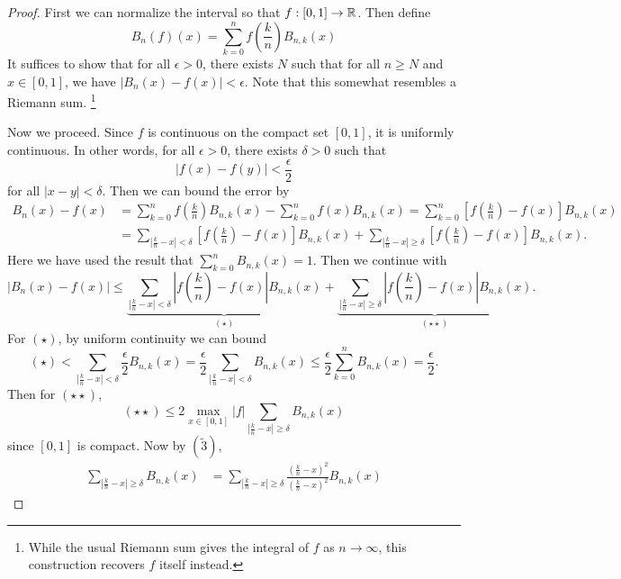 \begin{proof}
  First we can normalize the interval so that
  $f : [0, 1] \to \mathbb{R}$. Then define
  \[
    B_n(f)(x) = \sum_{k = 0}^n f\left(\frac{k}{n}\right) B_{n, k}(x)
  \]
  It suffices to show that for all $\epsilon > 0$,
  there exists $N$ such that for all $n \ge N$ and
  $x \in [0, 1]$, we have $|B_n(x) - f(x)| < \epsilon$.
  Note that this somewhat resembles a Riemann sum.
  \footnote{While the usual Riemann sum gives the integral of $f$ as $n \to \infty$, this construction recovers $f$ itself instead.}

  Now we proceed. Since $f$ is continuous on the compact
  set $[0, 1]$, it is uniformly continuous. In other
  words, for all $\epsilon > 0$, there exists $\delta > 0$
  such that
  \[
  |f(x) - f(y)| < \frac{\epsilon}{2}
  \]
  for all $|x - y| < \delta$. Then we can bound the
  error by
  \begin{align*}
    B_n(x) - f(x)
    &= \sum_{k = 0}^n f\left(\frac{k}{n}\right) B_{n, k}(x) - \sum_{k = 0}^n f(x) B_{n, k}(x)
    = \sum_{k = 0}^n \left[f\left(\frac{k}{n}\right) - f(x)\right] B_{n, k}(x) \\
    &= \sum_{\left|\frac{k}{n} - x\right| < \delta}
    \left[f\left(\frac{k}{n}\right) - f(x)\right] B_{n, k}(x)
    + \sum_{\left|\frac{k}{n} - x\right| \ge \delta}
    \left[f\left(\frac{k}{n}\right) - f(x)\right] B_{n, k}(x).
  \end{align*}
  Here we have used the result that
  $\sum_{k = 0}^n B_{n, k}(x) = 1$. Then we continue with
  \[
    |B_n(x) - f(x)| \le
    \underbrace{\sum_{\left|\frac{k}{n} - x\right| < \delta}
    \left|f\left(\frac{k}{n}\right) - f(x)\right| B_{n, k}(x)}_{(\star)}
    + \underbrace{\sum_{\left|\frac{k}{n} - x\right| \ge \delta}
    \left|f\left(\frac{k}{n}\right) - f(x)\right| B_{n, k}(x)}_{(\star \star)}
  .\]
  For $(\star)$, by uniform continuity we can bound
  \[
    (\star) < \sum_{\left|\frac{k}{n} - x\right| < \delta}
    \frac{\epsilon}{2} B_{n, k}(x)
    = \frac{\epsilon}{2} \sum_{\left|\frac{k}{n} - x\right| < \delta} B_{n, k}(x)
    \le \frac{\epsilon}{2} \sum_{k = 0}^n B_{n, k}(x)
    = \frac{\epsilon}{2}
  .\]
  Then for $(\star \star)$,
  \[
    (\star \star) \le 2 \max_{x \in [0, 1]} |f|
    \sum_{\left|\frac{k}{n} - x\right| \ge \delta} B_{n, k}(x)
  \]
  since $[0, 1]$ is compact. Now by $(\widetilde{3})$,
  \begin{align*}
    \sum_{\left|\frac{k}{n} - x\right| \ge \delta} B_{n, k}(x) &= \sum_{\left|\frac{k}{n} - x\right| \ge \delta}
    \frac{\left(\frac{k}{n} - x\right)^2}{\left(\frac{k}{n} - x\right)^2} B_{n, k}(x)

\end{align*}
\end{proof}
